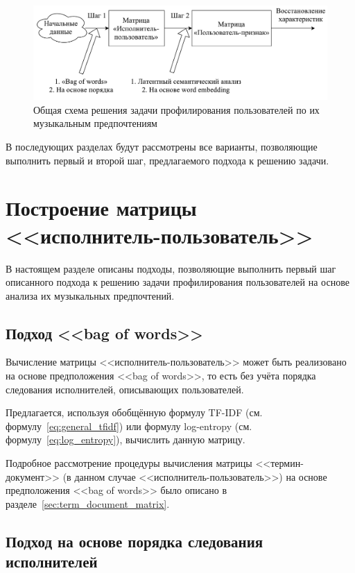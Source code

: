 \begin{figure}[!h]
\caption{Общая схема решения задачи профилирования пользователей
         по их музыкальным предпочтениям}
\label{fig:general_approach}
\centering
\includegraphics[width=\textwidth]{figs/general-approach.pdf}
\end{figure}

В последующих разделах будут рассмотрены все варианты,
позволяющие выполнить первый и второй шаг, предлагаемого
подхода к решению задачи.

\section{Построение матрицы <<исполнитель-пользователь>>}
\label{sec:step1_artist_user_matrix}

В настоящем разделе описаны подходы, позволяющие выполнить
первый шаг описанного подхода к решению задачи профилирования
пользователей на основе анализа их музыкальных предпочтений.

\subsection{Подход <<bag of words>>}

Вычисление матрицы <<исполнитель-пользователь>> может быть
реализовано на основе предположения <<bag of words>>, то есть
без учёта порядка следования исполнителей, описывающих пользователей.

Предлагается, используя обобщённую формулу TF-IDF 
(см. формулу~\ref{eq:general_tfidf}) или формулу log-entropy
(см. формулу~\ref{eq:log_entropy}), вычислить данную матрицу.

Подробное рассмотрение процедуры вычисления матрицы <<термин-документ>>
(в данном случае <<исполнитель-пользователь>>) на основе
предположения <<bag of words>> было описано в 
разделе~\ref{sec:term_document_matrix}.

\subsection{Подход на основе порядка следования исполнителей}
\label{ssec:artist_order}

